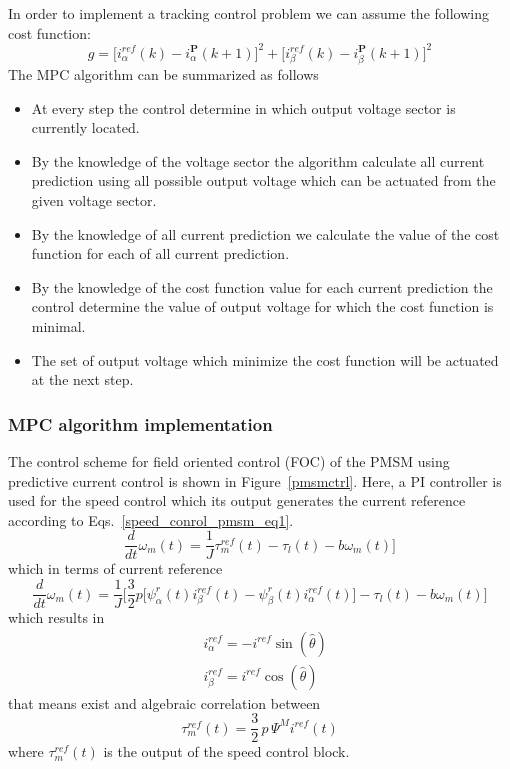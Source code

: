 \documentclass[11pt,a4paper]{scrartcl}
\numberwithin{equation}{section}
\theoremstyle{it}
\theoremstyle{definition}
\begin{document}
\begin{onehalfspace}
In order to implement a tracking control problem we can assume the following cost function:
\begin{equation}
	g=\Big[i_\alpha^{ref}(k) - i_\alpha^{\mathbf{P}}(k+1)\Big]^2+ 
	\Big[i_\beta^{ref}(k) -i_\beta^{\mathbf{P}}(k+1)\Big]^2
\end{equation}
The MPC algorithm can be summarized as follows
\begin{itemize}
	\item[--] At every step the control determine in which output voltage sector is currently located. 
	\item[--] By the knowledge of the voltage sector the algorithm calculate all current prediction using all possible output voltage which can be actuated from the given voltage sector.
	\item[--] By the knowledge of all current prediction we calculate the value of the cost function for each of all current prediction.
	\item[--] By the knowledge of the cost function value for each current prediction the control determine the value of output voltage for which the cost function is minimal.
	\item[--] The set of output voltage which minimize the cost function will be actuated at the next step.
\end{itemize}

\subsubsection{MPC algorithm implementation}
The control scheme for field oriented control (FOC) of the PMSM using 
predictive current control is shown in Figure~\ref{pmsmctrl}. Here, a PI 
controller is used for the speed control which its output generates the current 
reference according to Eqs.~\ref{speed_conrol_pmsm_eq1}. 
\begin{equation}\label{speed_conrol_pmsm_eq1}
	\frac{d}{dt}{\omega}_m(t) = 
	\frac{1}{J}\tau_m^{ref}(t)
	-\tau_l(t) -b{\omega}_m(t)\Bigg]
\end{equation}
which in terms of current reference
\begin{equation}\label{speed_conrol_pmsm_eq2}
	\frac{d}{dt}{\omega}_m(t) = 
	\frac{1}{J}\Bigg[\frac{3}{2}p\Big[\psi^r_{\alpha}(t)i_{\beta}^{ref}(t)-\psi^r_{\beta}(t)i_{\alpha}^{ref}(t)\Big]
	-\tau_l(t) -b{\omega}_m(t)\Bigg]
\end{equation}
which results in
\begin{equation}\label{speed_conrol_pmsm_eq3}
	\begin{aligned}
		&i_{\alpha}^{ref} = -i^{ref}\sin(\hat{\theta})  \\[6pt]
		&i_{\beta}^{ref} = i^{ref}\cos(\hat{\theta})
	\end{aligned} 
\end{equation}
that means exist and algebraic correlation between 
\begin{equation}
	\tau_m^{ref}(t)=\frac{3}{2}\,p\,\Psi^Mi^{ref}(t)
\end{equation}
where $\tau_m^{ref}(t)$ is the output of the speed control block.


\end{onehalfspace}
\end{document}
